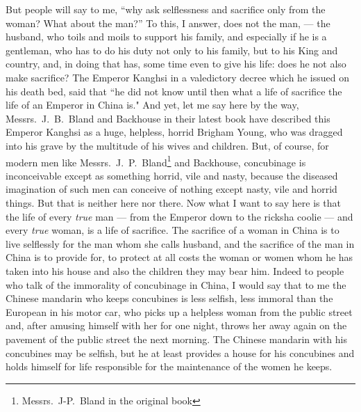 But people will say to me, ``why ask selflessness and sacrifice only from the woman? What about the man?'' 
To this, I answer, does not the man, --- the husband, who toils and moils to support his family, and especially if he is a gentleman, who has to do his duty not only to his family, but to his King and country, and, in doing that has, some time even to give his life: does he not also make sacrifice?
The Emperor Kanghsi in a valedictory decree which he issued on his death bed, said that ``he did not know until then what a life of sacrifice the life of an Emperor in China is." 
And yet, let me say here by the way, Messrs.~J.~B.~Bland  and Backhouse  in their latest book have described this Emperor Kanghsi as a huge, helpless, horrid Brigham Young,  who was dragged into his grave by the multitude of his wives and children.
But, of course, for modern men like Messrs.~J.~P.~Bland\footnote{Messrs.~J-P.~Bland in the original book} and Backhouse, concubinage is  inconceivable except as something horrid, vile and nasty, because the diseased imagination of such men can conceive of nothing except nasty, vile and horrid things.
But that is neither here nor there.
Now what I want to say here is that  the life of every \emph{true} man --- from the Emperor down to the ricksha coolie  --- and every \emph{true} woman, is a life of sacrifice.
The sacrifice of a woman in China is to live selflessly for the man whom she calls husband, and the sacrifice of the man in China is to provide for, to protect at all costs the woman or women whom he has taken into his house and also the children they may bear him.
Indeed to people who talk of the immorality of concubinage in China, I would say that to me the Chinese mandarin who keeps concubines is less selfish, less immoral than the European in his motor car, who picks up a helpless woman from the public street and, after amusing himself with her for one night, throws her away again on the pavement of the public street the next morning.
The Chinese mandarin with his concubines may be selfish, but he at least provides a house for his concubines and holds himself for life responsible for the maintenance of the women he keeps.
